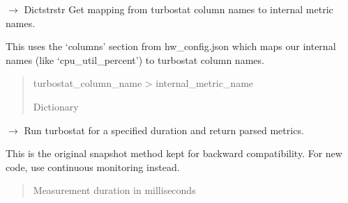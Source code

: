 \documentclass[letterpaper,10pt,english]{sphinxmanual}
\begin{document}
\begin{fulllineitems}
\begin{fulllineitems}
\end{fulllineitems}


\begin{fulllineitems}
\label{\detokenize{core.readers.turbostat_reader:core.readers.turbostat_reader.TurbostatReader.get_column_mapping}}
\pysigstartsignatures
\pysiglinewithargsret
{}
{}
{{ $\rightarrow$ Dict\DUrole{p}{{[}}strstr\DUrole{p}{{]}}}}
\pysigstopsignatures
\sphinxAtStartPar
Get mapping from turbostat column names to internal metric names.

\sphinxAtStartPar
This uses the ‘columns’ section from hw\_config.json which maps
our internal names (like ‘cpu\_util\_percent’) to turbostat column names.
\begin{quote}\begin{description}
\sphinxAtStartPar
turbostat\_column\_name \sphinxhyphen{}\textgreater{} internal\_metric\_name

\sphinxAtStartPar
Dictionary

\end{description}\end{quote}

\end{fulllineitems}


\begin{fulllineitems}
\label{\detokenize{core.readers.turbostat_reader:core.readers.turbostat_reader.TurbostatReader.read_metrics}}
\pysigstartsignatures
\pysiglinewithargsret
{}
{}
{{ $\rightarrow$ {\hyperref[\detokenize{core.models.energy_measurement:core.models.energy_measurement.PowerState}]{}}}}
\pysigstopsignatures
\sphinxAtStartPar
Run turbostat for a specified duration and return parsed metrics.

\sphinxAtStartPar
This is the original snapshot method kept for backward compatibility.
For new code, use continuous monitoring instead.
\begin{quote}\begin{description}
\sphinxAtStartPar
{} \textendash{} Measurement duration in milliseconds


\end{description}
\end{quote}
\end{fulllineitems}
\end{fulllineitems}
\end{document}
